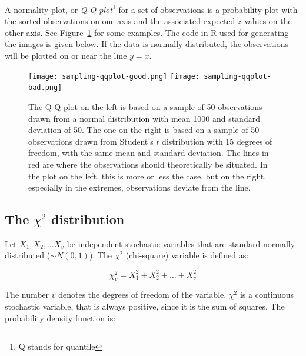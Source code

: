 \begin{definition}
  \label{def:qq-plot}
  A normality plot, or \emph{Q-Q plot}\footnote{Q stands for quantile} for a set of observations is a probability plot with the sorted observations on one axis and the associated expected $z$-values on the other axis. See Figure~\ref{fig:qqplot} for some examples. The code in R used for generating the images is given below. If the data is normally distributed, the observations will be plotted on or near the line $y = x$.
\end{definition}

\begin{figure}
  
  \begin{center}
  \texttt{[image: sampling-qqplot-good.png]}
  \texttt{[image: sampling-qqplot-bad.png]}
  \end{center}
  \caption{The Q-Q plot on the left is based on a sample of 50 observations drawn from a normal distribution with mean 1000 and standard deviation of 50. The one on the right is based on a sample of 50 observations drawn from Student's $t$ distribution with 15 degrees of freedom, with the same mean and standard deviation. The lines in red are where the observations should theoretically be situated. In the plot on the left, this is more or less the case, but on the right, especially in the extremes, observations deviate from the line.}
  \label{fig:qqplot}
\end{figure}



\subsection[The chi-square distribution]{The $\chi^{2}$ distribution}
\label{ssec:chi-square-distribution}

Let $X_{1}, X_{2}, \dots X_{v}$ be independent stochastic variables that are standard normally distributed ($\sim N(0,1)$). The $\chi^{2}$ (chi-square) variable is defined as:

\begin{equation}
  \chi^{2}_{v} = X_{1}^{2} + X_{2}^{2} + \dots + X_{v}^{2} 
\end{equation}

The number $v$ denotes the degrees of freedom of the variable. $\chi^{2}$ is a continuous stochastic variable, that is always positive, since it is the sum of squares. The probability density function is:

